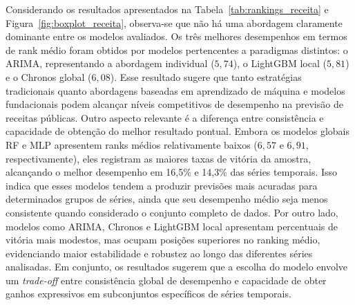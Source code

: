 \documentclass[12pt]{article}
\begin{document}
Considerando os resultados apresentados na Tabela~\ref{tab:rankings_receita} e Figura~\ref{fig:boxplot_receita}, observa-se que não há uma abordagem claramente dominante entre os modelos avaliados. Os três melhores desempenhos em termos de rank médio foram obtidos por modelos pertencentes a paradigmas distintos: o ARIMA, representando a abordagem individual ($5,74$), o LightGBM local ($5,81$) e o Chronos global ($6,08$). Esse resultado sugere que tanto estratégias tradicionais quanto abordagens baseadas em aprendizado de máquina e modelos fundacionais podem alcançar níveis competitivos de desempenho na previsão de receitas públicas. Outro aspecto relevante é a diferença entre consistência e capacidade de obtenção do melhor resultado pontual. Embora os modelos globais RF e MLP apresentem ranks médios relativamente baixos ($6,57$ e $6,91$, respectivamente), eles registram as maiores taxas de vitória da amostra, alcançando o melhor desempenho em 16,5\% e 14,3\% das séries temporais. Isso indica que esses modelos tendem a produzir previsões mais acuradas para determinados grupos de séries, ainda que seu desempenho médio seja menos consistente quando considerado o conjunto completo de dados. Por outro lado, modelos como ARIMA, Chronos e LightGBM local apresentam percentuais de vitória mais modestos, mas ocupam posições superiores no ranking médio, evidenciando maior estabilidade e robustez ao longo das diferentes séries analisadas. Em conjunto, os resultados sugerem que a escolha do modelo envolve um \emph{trade-off} entre consistência global de desempenho e capacidade de obter ganhos expressivos em subconjuntos específicos de séries temporais.
\end{document}
